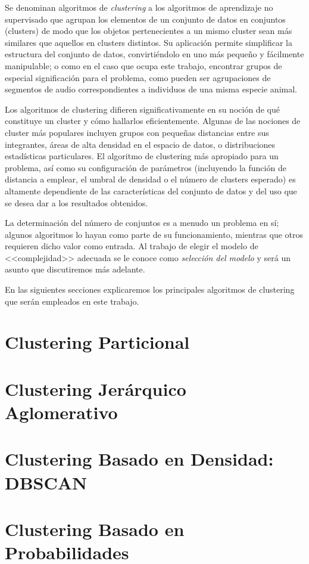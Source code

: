 Se denominan algoritmos de \textit{clustering} a los algoritmos de aprendizaje no supervisado que agrupan los elementos de un conjunto de datos en conjuntos (clusters) de modo que los objetos pertenecientes a un mismo cluster sean más similares que aquellos en clusters distintos.
Su aplicación permite simplificar la estructura del conjunto de datos, convirtiéndolo en uno más pequeño y fácilmente manipulable;
o como en el caso que ocupa este trabajo, encontrar grupos de especial significación para el problema, como pueden ser agrupaciones de segmentos de audio correspondientes a individuos de una misma especie animal.

Los algoritmos de clustering difieren significativamente en su noción de qué constituye un cluster y cómo hallarlos eficientemente.
Algunas de las nociones de cluster más populares incluyen grupos con pequeñas distancias entre sus integrantes, áreas de alta densidad en el espacio de datos, o distribuciones estadísticas particulares.
El algoritmo de clustering más apropiado para un problema, así como su configuración de parámetros (incluyendo la función de distancia a emplear, el umbral de densidad o el número de clusters esperado) es altamente dependiente de las características del conjunto de datos y del uso que se desea dar a los resultados obtenidos.

La determinación del número de conjuntos es a menudo un problema en sí;
algunos algoritmos lo hayan como parte de su funcionamiento, mientras que otros requieren dicho valor como entrada.
Al trabajo de elegir el modelo de <<complejidad>> adecuada se le conoce como \textit{selección del modelo} y será un asunto que discutiremos más adelante. %

En las siguientes secciones explicaremos los principales algoritmos de clustering que serán empleados en este trabajo.

\section{Clustering Particional}\label{sec:clusteringParticional}


\section{Clustering Jerárquico Aglomerativo}\label{sec:clusteringJerárquicoAglomerativo}


\section{Clustering Basado en Densidad: DBSCAN}\label{sec:Dbscan}


\section{Clustering Basado en Probabilidades}\label{sec:clusteringBasadoEnProbabilidades}

